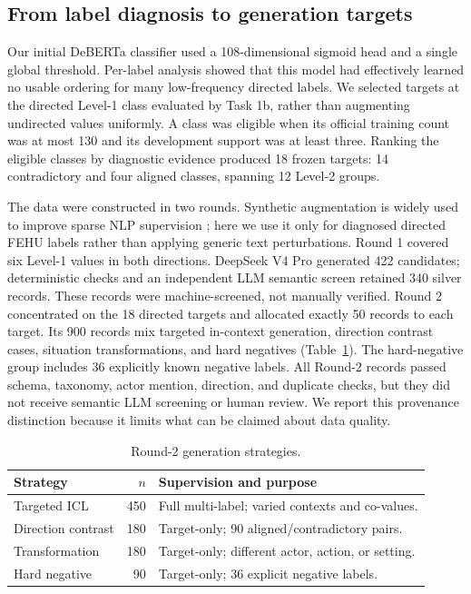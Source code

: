 \documentclass[sigconf,article,a4paper]{acmart}
\begin{document}
\subsection{From label diagnosis to generation targets}

Our initial DeBERTa classifier used a 108-dimensional sigmoid head and a single
global threshold. Per-label analysis showed that this model had effectively
learned no usable ordering for many low-frequency directed labels. We selected
targets at the directed Level-1 class evaluated by Task 1b, rather
than augmenting undirected values uniformly. A class was eligible when its
official training count was at most 130 and its
development support was at least three. Ranking the eligible classes by
diagnostic evidence produced 18 frozen targets: 14 contradictory and four
aligned classes, spanning 12 Level-2 groups.

The data were constructed in two rounds. Synthetic augmentation is widely used
to improve sparse NLP supervision \cite{feng2021}; here we use it only for
diagnosed directed FEHU labels rather than applying generic text perturbations.
Round 1 covered six Level-1 values in
both directions. DeepSeek V4 Pro generated 422 candidates; deterministic checks
and an independent LLM semantic screen retained 340 silver records. These
records were machine-screened, not manually verified. Round 2 concentrated on
the 18 directed targets and allocated exactly 50 records to each target. Its
900 records mix targeted in-context generation, direction contrast cases,
situation transformations, and hard negatives (Table~\ref{tab:generation}).
The hard-negative group includes 36
explicitly known negative labels. All Round-2 records passed schema, taxonomy,
actor mention, direction, and duplicate checks, but they did not receive
semantic LLM screening or human review. We report this provenance distinction
because it limits what can be claimed about data quality.

\begin{table}[H]
  \caption{Round-2 generation strategies.}
  \label{tab:generation}
  \scriptsize
  \begin{tabularx}{\columnwidth}{@{}XrX@{}}
    \toprule
    Strategy & $n$ & Supervision and purpose \\
    \midrule
    Targeted ICL & 450 & Full multi-label; varied contexts and co-values. \\
    Direction contrast & 180 & Target-only; 90 aligned/contradictory pairs. \\
    Transformation & 180 & Target-only; different actor, action, or setting. \\
    Hard negative & 90 & Target-only; 36 explicit negative labels. \\
    \bottomrule
  \end{tabularx}
\end{table}
\end{document}
